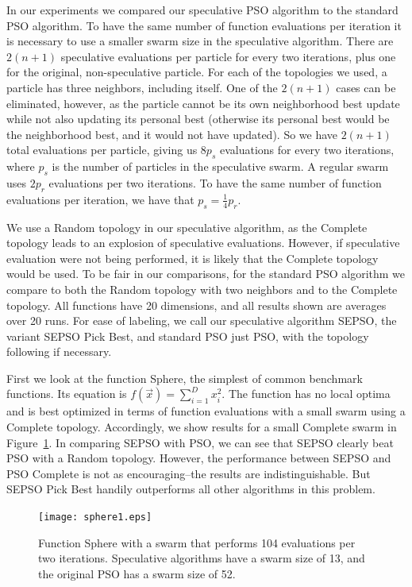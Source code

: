 \documentclass[conference,letterpaper]{IEEEtran}
\newcommand{\fig}[1]{Figure~\ref{fig:#1}}
\begin{document}
In our experiments we compared our speculative PSO algorithm to the standard
PSO algorithm.  To have the same number of function evaluations per iteration
it is necessary to use a smaller swarm size in the speculative algorithm.
There are $2(n+1)$ speculative evaluations per particle for every two
iterations, plus one for the original, non-speculative particle.  For each of
the topologies we used, a particle has three neighbors, including itself.  One
of the $2(n+1)$ cases can be eliminated, however, as the particle cannot be its
own neighborhood best update while not also updating its personal best
(otherwise its personal best would be the neighborhood best, and it would not
have updated).  So we have $2(n+1)$ total evaluations per particle, giving us
$8p_s$ evaluations for every two iterations, where $p_s$ is the number of
particles in the speculative swarm.  A regular swarm uses $2p_r$ evaluations
per two iterations.  To have the same number of function evaluations per
iteration, we have that $p_s = \frac{1}{4}p_r$.

We use a Random topology in our speculative algorithm, as the Complete topology
leads to an explosion of speculative evaluations.  However, if speculative
evaluation were not being performed, it is likely that the Complete topology
would be used.  To be fair in our comparisons, for the standard PSO algorithm
we compare to both the Random topology with two neighbors and to the Complete
topology.  All functions have 20 dimensions, and all results shown are averages
over 20 runs.  For ease of labeling, we call our speculative algorithm SEPSO,
the variant SEPSO Pick Best, and standard PSO just PSO, with the topology
following if necessary.

First we look at the function Sphere, the simplest of common benchmark
functions.  Its equation is $f(\Vec{x}) = \sum_{i=1}^D x_i^2$.  The function
has no local optima and is best optimized in terms of function evaluations with
a small swarm using a Complete topology.  Accordingly, we show results for a
small Complete swarm in \fig{sphere1}.  In comparing SEPSO with PSO, we can see
that SEPSO clearly beat PSO with a Random topology.  However, the performance
between SEPSO and PSO Complete is not as encouraging--the results are
indistinguishable.  But SEPSO Pick Best handily outperforms all other
algorithms in this problem.

\begin{figure}
  \texttt{[image: sphere1.eps]}
  \caption{Function Sphere with a swarm that performs 104 evaluations per two
  iterations.  Speculative algorithms have a swarm size of 13, and the original
  PSO has a swarm size of 52.}
  \label{fig:sphere1}
\end{figure}
\end{document}
